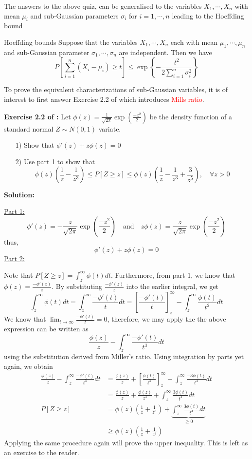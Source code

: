 \documentclass[10pt,handout,english]{beamer}
\begin{document}
\begin{frame}
The answers to the above quiz, can be generalised to the variables $X_1,\cdots,X_n$ with mean $\mu_i$ and sub-Gaussian parameters $\sigma_i$ for $i=1,\cdots,n$ leading to the Hoeffding bound 
\begin{block}{Hoeffding bounds}
Suppose that the variables $X_1,\cdots,X_n$ each with mean $\mu_1,\cdots,\mu_n$ and sub-Gaussian parameter $\sigma_1,\cdots,\sigma_n$ are independent. Then we have
\[
P\left[\sum\limits_{i=1}^n(X_i-\mu_i)\geq t\right]\leq\exp\left\{-\frac{t^2}{2\sum_{i=1}^n\sigma_i^2}\right\}
\]
\end{block}
\end{frame}
\begin{frame}[allowframebreaks]
To prove the equivalent characterizations of sub-Gaussian variables, it is of interest to first answer Exercise 2.2 of \citet{wainwright2019high} which introduces \textcolor{red}{Mills ratio}.

\textbf{Exercise 2.2 of \citet{wainwright2019high}:} Let $\phi(z)=\frac{1}{\sqrt{2\pi}}\exp\left(\frac{-z^2}{2}\right)$ be the density function of a standard normal $Z\sim N(0,1)$ variate.
\begin{itemize}
\item[1)]Show that $\phi'(z)+z\phi(z)=0$
\item[2)] Use part 1 to show that
\[
\phi(z)\left(\frac{1}{z}-\frac{1}{z^3}\right)\leq P[Z\geq z]\leq\phi(z)\left(\frac{1}{z}-\frac{1}{z^3}+\frac{3}{z^5}\right),\quad \forall z>0
\]
\end{itemize}
\textbf{Solution:}

\underline{Part 1:}
\[
\phi'(z)=-\frac{z}{\sqrt{2\pi}}\exp\left(\frac{-z^2}{2}\right)\quad \text{and}\quad z\phi(z)=\frac{z}{\sqrt{2\pi}}\exp\left(\frac{-z^2}{2}\right) 
\]
thus,
\[
\phi'(z)+z\phi(z)=0
\]
\underline{Part 2:} 

Note that $P[Z\geq z]=\int_{z}^{\infty}\phi(t)dt$. Furthermore, from part 1, we know that $\phi(z)=\frac{-\phi'(z)}{z}$. By substituting $\frac{-\phi'(z)}{z}$ into the earlier integral, we get
\[
\int_{z}^{\infty}\phi(t)dt=\int_{z}^{\infty}\frac{-\phi'(t)}{t}dt=\left[\frac{-\phi'(t)}{t}\right]_{z}^{\infty}-\int_{z}^{\infty} \frac{\phi(t)}{t^2}dt
\]
We know that $\lim_{t\to \infty}\frac{-\phi'(t)}{t}=0$, therefore, we may apply the the above expression can be written as
\[
\frac{\phi(z)}{z}-\int_{z}^{\infty} \frac{-\phi'(t)}{t^3}dt
\] 
using the substitution derived from Miller's ratio. Using integration by parts yet again, we obtain
\begin{align*}
\frac{\phi(z)}{z}-\int_{z}^{\infty} \frac{-\phi'(t)}{t^3}dt&=\frac{\phi(z)}{z}+\left[\frac{\phi(t)}{t^3}\right]_{z}^{\infty}-\int_{z}^{\infty}\frac{-3\phi(t)}{t^4}dt\\
&=\frac{\phi(z)}{z}+\frac{\phi(z)}{z^3}+\int_{z}^{\infty}\frac{3\phi(t)}{t^4}dt\\
P[Z\geq z]&=\phi(z)\left(\frac{1}{z}+\frac{1}{z^3}\right)+\underbrace{\int_{z}^{\infty}\frac{3\phi(t)}{t^4}dt}_{\geq0}\\
		&\geq \phi(z)\left(\frac{1}{z}+\frac{1}{z^3}\right)
\end{align*}
Applying the same procedure again will prove the upper inequality. This is left as an exercise to the reader.
\end{frame}
\end{document}
